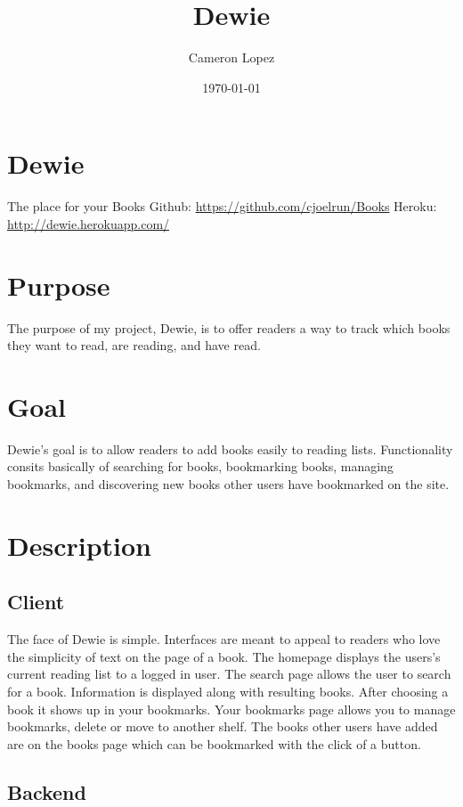 \documentclass[11pt]{article}
\title{Dewie}
\author{Cameron Lopez}
\date{\today}
\begin{document}
\maketitle

\setcounter{tocdepth}{3}
\tableofcontents
\vspace*{1cm}
\section{Dewie}
\label{sec-1}

  The place for your Books
  Github: \href{https://github.com/cjoelrun/Books}{https://github.com/cjoelrun/Books}
  Heroku: \href{http://dewie.herokuapp.com/}{http://dewie.herokuapp.com/}
\section{Purpose}
\label{sec-2}

  The purpose of my project, Dewie, is to offer readers a way to track which books they want to read, are reading, and have read.
\section{Goal}
\label{sec-3}

  Dewie's goal is to allow readers to add books easily to reading lists.  Functionality consits basically of searching for books, bookmarking books, managing bookmarks, and discovering new books other users have bookmarked on the site.
\section{Description}
\label{sec-4}
\subsection{Client}
\label{sec-4-1}

   The face of Dewie is simple.  Interfaces are meant to appeal to readers who love the simplicity of text on the page of a book.  The homepage displays the users's current reading list to a logged in user.  The search page allows the user to search for a book.  Information is displayed along with resulting books.  After choosing a book it shows up in your bookmarks.  Your bookmarks page allows you to manage bookmarks, delete or move to another shelf.  The books other users have added are on the books page which can be bookmarked with the click of a button.
\subsection{Backend}
\label{sec-4-2}
\end{document}
